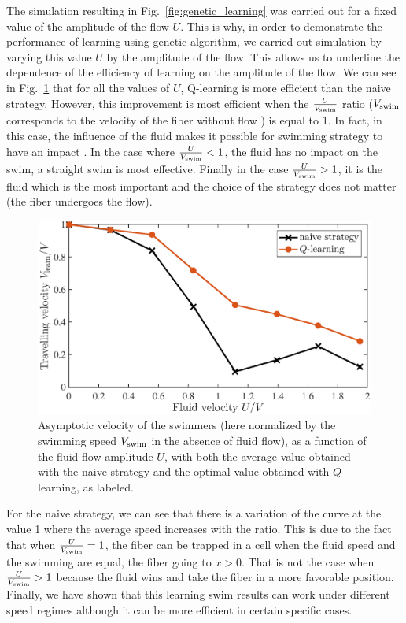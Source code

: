 \documentclass[aps,prl,preprint,groupedaddress]{revtex4-2}
\begin{document}
The simulation resulting in Fig.~\ref{fig:genetic_learning} was carried out for a fixed value of the amplitude of the flow $U$. This is why, in order to demonstrate the performance of learning using genetic algorithm, we carried out simulation by varying this value $U$ by the amplitude of the flow. This allows us to underline the dependence of the efficiency of learning on the amplitude of the flow. We can see in Fig.~\ref{fig:vel_VarU} that for all the values of $U$, Q-learning is more efficient than the naive strategy. However, this improvement is most efficient when the $\frac{U}{V_{\rm swim}}$ ratio ($V_{\rm swim}$ corresponds to the velocity of the fiber without flow ) is equal to 1. In fact, in this case, the influence of the fluid makes it possible for swimming strategy to have an impact . In the case where $ \frac{U}{V_{\rm swim}}<1$, the fluid has no impact on the swim, a straight swim is most effective. Finally in the case $ \frac{U}{V_{\rm swim}}>1$, it is the fluid which is the most important and the choice of the strategy does not matter (the fiber undergoes the flow).



\begin{figure}[ht]
  \centerline{\includegraphics[width=\columnwidth]{vel_varU}}
  \caption{\label{fig:vel_VarU} Asymptotic velocity of the swimmers (here normalized by the swimming speed $V_{\rm swim}$ in the absence of fluid flow), as a function of the fluid flow amplitude $U$, with both the average value obtained with the naive strategy and the optimal value obtained with $Q$-learning, as labeled. }
\end{figure}

For the naive strategy, we can see that there is a variation of the curve at the value 1 where the average speed increases with the ratio. This is due to the fact that when $ \frac{U}{V_{\rm swim}}=1$, the fiber can be trapped in a cell when the fluid speed and the swimming are equal, the fiber going to $x>0$. That is not the case when $ \frac{U}{V_{\rm swim}}>1$ because the fluid wins and take the fiber in a more favorable position.
Finally, we have shown that this learning swim results can work under different speed regimes although it can be more efficient in certain specific cases.
\end{document}

